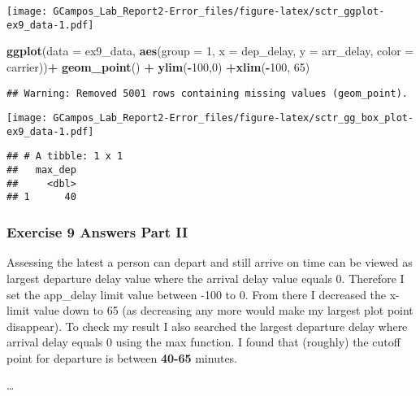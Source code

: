 \documentclass[
]{article}
\newenvironment{Shaded}{\begin{snugshade}}{\end{snugshade}}
\newcommand{\DataTypeTok}[1]{\textcolor[rgb]{0.13,0.29,0.53}{#1}}
\newcommand{\DecValTok}[1]{\textcolor[rgb]{0.00,0.00,0.81}{#1}}
\newcommand{\KeywordTok}[1]{\textcolor[rgb]{0.13,0.29,0.53}{\textbf{#1}}}
\newcommand{\NormalTok}[1]{#1}
\newcommand{\OperatorTok}[1]{\textcolor[rgb]{0.81,0.36,0.00}{\textbf{#1}}}
\newcommand{\StringTok}[1]{\textcolor[rgb]{0.31,0.60,0.02}{#1}}
\begin{document}
\texttt{[image: GCampos\_Lab\_Report2-Error\_files/figure-latex/sctr\_ggplot-ex9\_data-1.pdf]}

\begin{Shaded}
\begin{Highlighting}[]
\KeywordTok{ggplot}\NormalTok{(}\DataTypeTok{data =}\NormalTok{ ex9_data, }\KeywordTok{aes}\NormalTok{(}\DataTypeTok{group =} \DecValTok{1}\NormalTok{, }\DataTypeTok{x =}\NormalTok{ dep_delay, }\DataTypeTok{y =}\NormalTok{ arr_delay, }\DataTypeTok{color =}\NormalTok{ carrier))}\OperatorTok{+}\StringTok{ }\KeywordTok{geom_point}\NormalTok{() }\OperatorTok{+}\StringTok{ }\KeywordTok{ylim}\NormalTok{(}\OperatorTok{-}\DecValTok{100}\NormalTok{,}\DecValTok{0}\NormalTok{) }\OperatorTok{+}\KeywordTok{xlim}\NormalTok{(}\OperatorTok{-}\DecValTok{100}\NormalTok{, }\DecValTok{65}\NormalTok{)}
\end{Highlighting}
\end{Shaded}

\begin{verbatim}
## Warning: Removed 5001 rows containing missing values (geom_point).
\end{verbatim}

\texttt{[image: GCampos\_Lab\_Report2-Error\_files/figure-latex/sctr\_gg\_box\_plot-ex9\_data-1.pdf]}

\begin{Shaded}
\end{Shaded}

\begin{verbatim}
## # A tibble: 1 x 1
##   max_dep
##     <dbl>
## 1      40
\end{verbatim}

\hypertarget{exercise-9-answers-part-ii}{%
\subsubsection{\texorpdfstring{\textbf{Exercise 9 Answers Part
II}}{Exercise 9 Answers Part II}}\label{exercise-9-answers-part-ii}}

\newline

Assessing the latest a person can depart and still arrive on time can be
viewed as largest departure delay value where the arrival delay value
equals 0. Therefore I set the app\_delay limit value between -100 to 0.
From there I decreased the x-limit value down to 65 (as decreasing any
more would make my largest plot point disappear).\newline \newline
\newline To check my result I also searched the largest departure delay
where arrival delay equals 0 using the max function.\newline
\newline \newline I found that (roughly) the cutoff point for departure
is between \textbf{40-65} minutes.

\ldots{}
\end{document}
